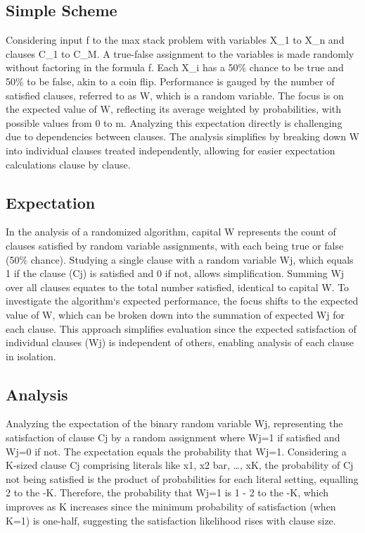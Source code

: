 \subsection*{Simple Scheme}
Considering input f to the max stack problem with variables X\_1 to X\_n and clauses C\_1 to C\_M\@.
A true-false assignment to the variables is made randomly without factoring in the formula f.
Each X\_i has a 50\% chance to be true and 50\% to be false, akin to a coin flip.
Performance is gauged by the number of satisfied clauses, referred to as W, which is a random variable.
The focus is on the expected value of W, reflecting its average weighted by probabilities, with possible values from 0 to m.
Analyzing this expectation directly is challenging due to dependencies between clauses.
The analysis simplifies by breaking down W into individual clauses treated independently, allowing for easier expectation calculations clause by clause.

\subsection*{Expectation}
In the analysis of a randomized algorithm, capital W represents the count of clauses satisfied by random variable assignments, with each being true or false (50\% chance).
Studying a single clause with a random variable Wj, which equals 1 if the clause (Cj) is satisfied and 0 if not, allows simplification.
Summing Wj over all clauses equates to the total number satisfied, identical to capital W\@.
To investigate the algorithm`s expected performance, the focus shifts to the expected value of W, which can be broken down into the summation of expected Wj for each clause.
This approach simplifies evaluation since the expected satisfaction of individual clauses (Wj) is independent of others, enabling analysis of each clause in isolation.

\subsection*{Analysis}
Analyzing the expectation of the binary random variable Wj, representing the satisfaction of clause Cj by a random assignment where Wj=1 if satisfied and Wj=0 if not.
The expectation equals the probability that Wj=1.
Considering a K-sized clause Cj comprising literals like x1, x2 bar, \ldots, xK, the probability of Cj not being satisfied is the product of probabilities for each literal setting, equalling 2 to the -K\@.
Therefore, the probability that Wj=1 is 1 - 2 to the -K, which improves as K increases since the minimum probability of satisfaction (when K=1) is one-half, suggesting the satisfaction likelihood rises with clause size.

